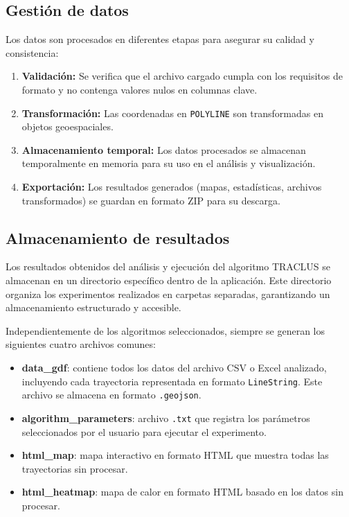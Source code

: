 \subsection{Gestión de datos}

Los datos son procesados en diferentes etapas para asegurar su calidad y consistencia:

\begin{enumerate}
    \item \textbf{Validación:} Se verifica que el archivo cargado cumpla con los requisitos de formato y no contenga valores nulos en columnas clave.
    \item \textbf{Transformación:} Las coordenadas en \texttt{POLYLINE} son transformadas en objetos geoespaciales.
    \item \textbf{Almacenamiento temporal:} Los datos procesados se almacenan temporalmente en memoria para su uso en el análisis y visualización.
    \item \textbf{Exportación:} Los resultados generados (mapas, estadísticas, archivos transformados) se guardan en formato ZIP para su descarga.
\end{enumerate}

\subsection{Almacenamiento de resultados}

Los resultados obtenidos del análisis y ejecución del algoritmo TRACLUS se almacenan en un directorio específico dentro de la aplicación. Este directorio organiza los experimentos realizados en carpetas separadas, garantizando un almacenamiento estructurado y accesible.

Independientemente de los algoritmos seleccionados, siempre se generan los siguientes cuatro archivos comunes:

\begin{itemize}
	\item \textbf{data\_gdf}: contiene todos los datos del archivo CSV o Excel analizado, incluyendo cada trayectoria representada en formato \texttt{LineString}. Este archivo se almacena en formato \texttt{.geojson}.
	\item \textbf{algorithm\_parameters}: archivo \texttt{.txt} que registra los parámetros seleccionados por el usuario para ejecutar el experimento.
	\item \textbf{html\_map}: mapa interactivo en formato HTML que muestra todas las trayectorias sin procesar.
	\item \textbf{html\_heatmap}: mapa de calor en formato HTML basado en los datos sin procesar.
\end{itemize}

